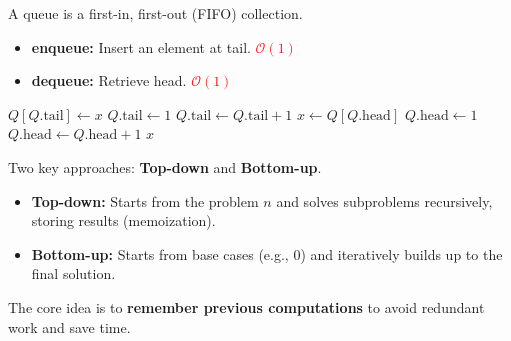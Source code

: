 \documentclass[a4paper,landscape]{article}
\newcommand{\timecomplexity}[1]{\textcolor{red}{#1}}
\newcommand{\bigo}{\mathcal{O}}
\begin{document}
\begin{multicols}{7}
\endtcolorbox
\tcolorbox[mybox={Queue}]
A queue is a first-in, first-out (FIFO) collection.
\begin{itemize}[noitemsep,itemsep=0pt]
    \item \textbf{enqueue:} Insert an element at tail. \timecomplexity{\(\bigo(1)\)}
    \item \textbf{dequeue:} Retrieve head. \timecomplexity{\(\bigo(1)\)}
\end{itemize}
\begin{algorithmic}[1]
        \State $Q[Q.\text{tail}] \gets x$
            \State $Q.\text{tail} \gets 1$
        \Else
            \State $Q.\text{tail} \gets Q.\text{tail} + 1$
        \EndIf
    \EndProcedure
    \State
        \State $x \gets Q[Q.\text{head}]$
            \State $Q.\text{head} \gets 1$
        \Else
            \State $Q.\text{head} \gets Q.\text{head} + 1$
        \EndIf
        \State \Return $x$
    \EndProcedure
\end{algorithmic}
\endtcolorbox
\tcolorbox[mybox={Dynamic Programming}]
Two key approaches: \textbf{Top-down} and \textbf{Bottom-up}.
\begin{itemize}[noitemsep, itemsep=0pt]
    \item \textbf{Top-down:} Starts from the problem $n$ and solves subproblems recursively, storing results (memoization).
    \item \textbf{Bottom-up:} Starts from base cases (e.g., 0) and iteratively builds up to the final solution.
\end{itemize}
The core idea is to \textbf{remember previous computations} to avoid redundant work and save time.
\endtcolorbox


\end{multicols}
\end{document}
